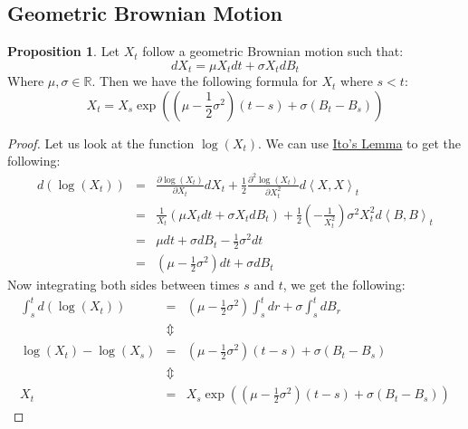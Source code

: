\documentclass[11pt]{article}
\theoremstyle{definition}
\newtheorem{prop}{Proposition}[section]
\newcommand{\brac}[1]{\left(#1\right)}
\newcommand{\pbrac}[1]{\left\langle#1\right\rangle}
\newcommand{\pardiff}[2]{\frac{\partial #1}{\partial #2}}
\newcommand{\R}{\mathbb{R}}
\begin{document}
\subsection{Geometric Brownian Motion}
	\begin{prop}
		Let $X_t$ follow a geometric Brownian motion such that: 
		\begin{equation}\label{gbm}
			dX_t = \mu X_t dt + \sigma X_t dB_t
		\end{equation}
		Where $\mu,\sigma\in\R$. Then we have the following formula for $X_t$ where $s<t$:
		\begin{equation}\label{gbmSol}
			X_t = X_s\exp\brac{\brac{\mu - \frac{1}{2}\sigma^2}\brac{t-s} + \sigma\brac{B_t - B_s}}
		\end{equation}
	\end{prop}
	\begin{proof}
		Let us look at the function $\log\brac{X_t}$. We can use \hyperref[itosLemma]{Ito's Lemma} to get the following:
		\begin{eqnarray*}
			d\brac{\log\brac{X_t}} &=& \pardiff{\log\brac{X_t}}{X_t}dX_t + \frac{1}{2}\pardiff{^2\log\brac{X_t}}{X_t^2}d\pbrac{X,X}_t\\
			&=& \frac{1}{X_t}\brac{\mu X_t dt + \sigma X_t dB_t} + \frac{1}{2}\brac{-\frac{1}{X_t^2}}\sigma^2 X_t^2 d\pbrac{B,B}_t\\
			&=& \mu dt + \sigma dB_t -\frac{1}{2}\sigma^2 dt\\
			&=& \brac{\mu - \frac{1}{2}\sigma^2}dt + \sigma dB_t
		\end{eqnarray*}
		Now integrating both sides between times $s$ and $t$, we get the following:
		\begin{eqnarray*}
			\int_{s}^{t}d\brac{\log\brac{X_t}} &=& \brac{\mu-\frac{1}{2}\sigma^2}\int_{s}^{t}dr + \sigma\int_{s}^{t}dB_r\\
			&\Updownarrow&\\
			\log\brac{X_t} - \log\brac{X_s} &=& \brac{\mu-\frac{1}{2}\sigma^2}\brac{t-s} + \sigma\brac{B_t - B_s}\\
			&\Updownarrow&\\
			X_t &=& X_s\exp\brac{\brac{\mu-\frac{1}{2}\sigma^2}\brac{t-s} + \sigma\brac{B_t - B_s}}
		\end{eqnarray*}
	\end{proof}
\end{document}
